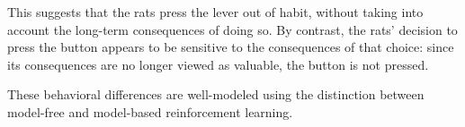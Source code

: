 This suggests that the rats press the lever out of habit, without taking into account the long-term consequences of doing so.
By contrast, the rats' decision to press the button appears to be sensitive to the consequences of that choice: since its consequences are no longer viewed as valuable, the button is not pressed.

These behavioral differences are well-modeled using the distinction between model-free and model-based reinforcement learning.

